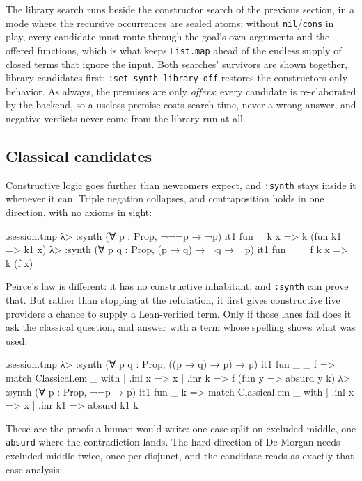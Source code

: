 \documentclass[11pt,oneside]{article}
\newcommand{\code}[1]{\texttt{#1}}
\newenvironment{session}
 {\VerbatimEnvironment\begin{VerbatimOut}{\jobname.session.tmp}}
 {\end{VerbatimOut}%
  \begin{sessionouter}%
  \VerbatimInput[fontsize=\footnotesize, breaklines=true,
    breaksymbolleft={\textcolor{stone}{\footnotesize$\hookrightarrow$}},
    formatcom=\color{ink}, tabsize=4]{\jobname.session.tmp}%
  \end{sessionouter}}
\begin{document}
The library search runs beside the constructor search of the previous
section, in a mode where the recursive occurrences are sealed atoms:
without \code{nil}/\code{cons} in play, every candidate must route
through the goal's own arguments and the offered functions, which is
what keeps \code{List.map} ahead of the endless supply of closed
terms that ignore the input. Both searches' survivors are shown
together, library candidates first; \code{:set synth-library off}
restores the constructors-only behavior. As always, the premises are
only \emph{offers}: every candidate is re-elaborated by the backend,
so a useless premise costs search time, never a wrong answer, and
negative verdicts never come from the library run at all.

\subsection{Classical candidates}\label{sec:classical}

Constructive logic goes further than newcomers expect, and
\code{:synth} stays inside it whenever it can. Triple negation
collapses, and contraposition holds in one direction, with no axioms
in sight:

\begin{session}
λ> :synth (∀ p : Prop, ¬¬¬p → ¬p)
  it1  fun _ k x => k (fun k1 => k1 x)
λ> :synth (∀ p q : Prop, (p → q) → ¬q → ¬p)
  it1  fun _ _ f k x => k (f x)
\end{session}

Peirce's law is different: it has no constructive inhabitant, and
\code{:synth} can prove that. But rather than stopping at the
refutation, it first gives constructive live providers a chance to supply a
Lean-verified term. Only if those lanes fail does it ask the classical
question, and answer with a term whose spelling shows what was used:

\begin{session}
λ> :synth (∀ p q : Prop, ((p → q) → p) → p)
  it1  fun _ _ f => match Classical.em _ with | .inl x => x | .inr k => f (fun y => absurd y k)
λ> :synth (∀ p : Prop, ¬¬p → p)
  it1  fun _ k => match Classical.em _ with | .inl x => x | .inr k1 => absurd k1 k
\end{session}

These are the proofs a human would write: one case split on excluded
middle, one \code{absurd} where the contradiction lands. The hard
direction of De Morgan needs excluded middle twice, once per
disjunct, and the candidate reads as exactly that case analysis:
\end{document}
